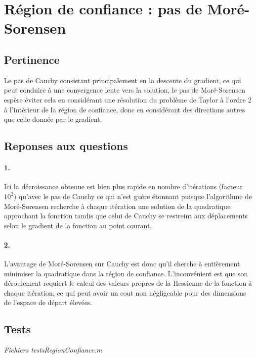 \documentclass[12pt]{article}
\begin{document}
\section{Région de confiance : pas de Moré-Sorensen}
\subsection{Pertinence}
Le pas de Cauchy consistant principalement en la descente du gradient, ce qui peut conduire à une convergence lente vers la solution, le pas de Moré-Sorensen espère éviter cela en considérant une résolution du problème de Taylor à l'ordre 2 à l'intérieur de la région de confiance, donc en considérant des directions autres que celle donnée par le gradient.

\subsection{Reponses aux questions}
\paragraph{1.}
Ici la décroissance obtenue est bien plus rapide en nombre d'itérations (facteur $10^2$) qu'avec le pas de Cauchy ce qui n'est guère étonnant puisque l'algorithme de Moré-Sorensen recherche à chaque itération une solution de la quadratique approchant la fonction tandis que celui de Cauchy se restreint aux déplacements selon le gradient de la fonction au point courant.

\paragraph{2.}
L'avantage de Moré-Sorensen sur Cauchy est donc qu'il cherche à entièrement minimiser la quadratique dans la région de confiance.
L'inconvénient est que son déroulement requiert le calcul des valeurs propres de la Hessienne de la fonction à chaque itération, ce qui peut avoir un cout non négligeable pour des dimensions de l'espace de départ élevées.

\subsection{Tests}
\begin{flushright}
\textit{Fichiers testsRegionConfiance.m}
\end{flushright}
\end{document}

